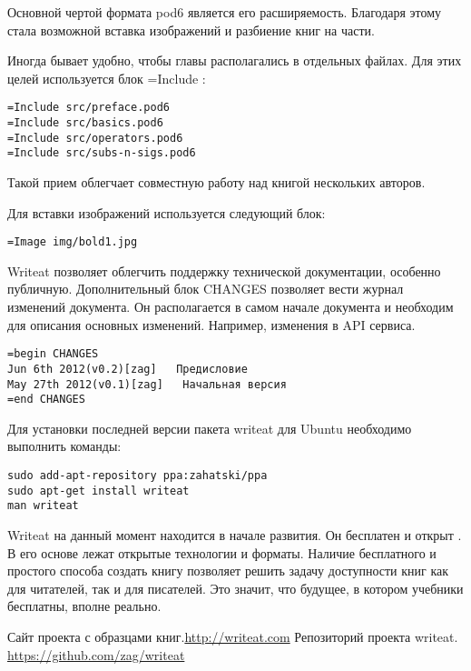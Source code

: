\documentclass[10pt, a5paper]{article}
\begin{document}
Основной чертой формата pod6 является его расширяемость. Благодаря этому 
стала возможной вставка изображений и разбиение книг на части.

Иногда бывает удобно, чтобы главы располагались в отдельных файлах. Для этих целей используется блок =Include :

\begin{verbatim}
=Include src/preface.pod6
=Include src/basics.pod6
=Include src/operators.pod6
=Include src/subs-n-sigs.pod6
\end{verbatim}

Такой прием облегчает совместную работу над книгой нескольких авторов.

Для вставки изображений используется следующий блок:

\begin{verbatim}
=Image img/bold1.jpg
\end{verbatim}

Writeat позволяет облегчить поддержку технической документации, особенно публичную. Дополнительный блок CHANGES позволяет вести журнал изменений документа. Он 
располагается в самом начале документа и необходим для описания основных 
изменений. Например, изменения в API сервиса.

\begin{verbatim}
=begin CHANGES
Jun 6th 2012(v0.2)[zag]   Предисловие
May 27th 2012(v0.1)[zag]   Начальная версия
=end CHANGES
\end{verbatim}

Для установки последней версии пакета writeat для Ubuntu необходимо выполнить команды:

\begin{verbatim}
sudo add-apt-repository ppa:zahatski/ppa
sudo apt-get install writeat
man writeat
\end{verbatim}

Writeat на данный момент находится в начале развития. Он бесплатен и открыт \cite{zag2}. В его основе лежат открытые технологии и форматы.
Наличие бесплатного и простого способа создать книгу позволяет решить задачу
доступности книг как для читателей, так и 
для писателей. Это значит, что будущее, в котором учебники 
бесплатны, вполне реально.
\begin{thebibliography}{9}
 Сайт проекта с образцами книг.\url{http://writeat.com}
 Репозиторий проекта writeat. \url{https://github.com/zag/writeat}
\end{thebibliography}
\end{document}
